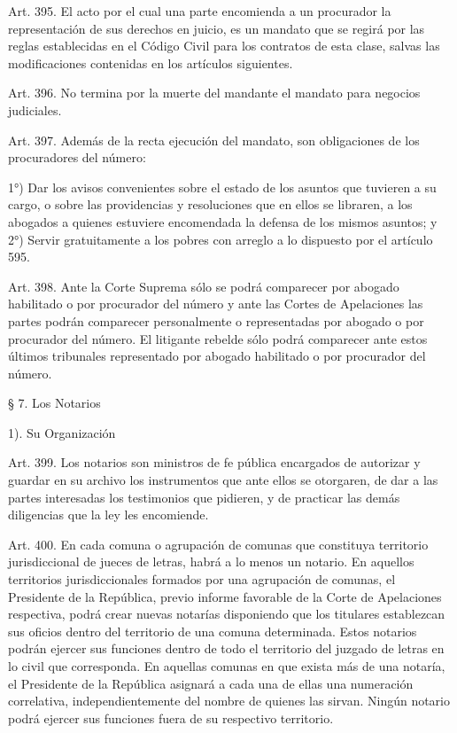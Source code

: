     Art. 395. El acto por el cual una parte encomienda a un procurador la representación de sus derechos en juicio, es un mandato que se regirá por las reglas establecidas en el Código Civil para los contratos de esta clase, salvas las modificaciones contenidas en los artículos siguientes.

    Art. 396. No termina por la muerte del mandante el mandato para negocios judiciales.


    Art. 397. Además de la recta ejecución del mandato, son obligaciones de los procuradores del número:

    1°) Dar los avisos convenientes sobre el estado de los asuntos que tuvieren a su cargo, o sobre las providencias y resoluciones que en ellos se libraren, a los abogados a quienes estuviere encomendada la defensa de los mismos asuntos; y
    2°) Servir gratuitamente a los pobres con arreglo a lo dispuesto por el artículo 595.

    Art. 398. Ante la Corte Suprema sólo se podrá comparecer por abogado habilitado o por procurador del número y ante las Cortes de Apelaciones las partes podrán comparecer personalmente o representadas por abogado o por procurador del número.
    El litigante rebelde sólo podrá comparecer ante estos últimos tribunales representado por abogado habilitado o por procurador del número.


    § 7. Los Notarios


    1). Su Organización


    Art. 399. Los notarios son ministros de fe pública encargados de autorizar y guardar en su archivo los instrumentos que ante ellos se otorgaren, de dar a las partes interesadas los testimonios que pidieren, y de practicar las demás diligencias que la ley les encomiende.


    Art. 400. En cada comuna o agrupación de comunas que constituya territorio jurisdiccional de jueces de letras, habrá a lo menos un notario.
    En aquellos territorios jurisdiccionales formados por una agrupación de comunas, el Presidente de la República, previo informe favorable de la Corte de Apelaciones respectiva, podrá crear nuevas notarías disponiendo que los titulares establezcan sus oficios dentro del territorio de una comuna determinada. Estos notarios podrán ejercer sus funciones dentro de todo el territorio del juzgado de letras en lo civil que corresponda.
    En aquellas comunas en que exista más de una notaría, el Presidente de la República asignará a cada una de ellas una numeración correlativa, independientemente del nombre de quienes las sirvan.
    Ningún notario podrá ejercer sus funciones fuera de su respectivo territorio.



